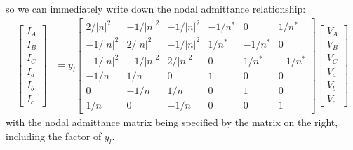 \documentclass[11pt]{article}
\begin{document}
so we can immediately write down the nodal admittance relationship:
\begin{align}
\begin{bmatrix}I_A \\ I_B \\ I_C \\ I_a \\ I_b \\ I_c\end{bmatrix} &=
y_l \begin{bmatrix}
	2/|n|^2 & -1/|n|^2 & -1/|n|^2 & -1/n^* & 0 & 1/n^* \\
	-1/|n|^2 & 2/|n|^2 &  -1/|n|^2 & 1/n^*  & -1/n^* & 0 \\
	-1/|n|^2 &  -1/|n|^2 & 2/|n|^2 & 0 & 1/n^*  & -1/n^* \\
	-1/n & 1/n & 0 & 1 & 0 & 0 \\
	0 & -1/n & 1/n & 0 & 1 & 0 \\
	1/n & 0 & -1/n & 0 & 0 & 1
\end{bmatrix}
\begin{bmatrix}V_A \\ V_B \\ V_C \\ V_a \\ V_b \\ V_c\end{bmatrix}
\end{align}
with the nodal admittance matrix being specified by the matrix on the right, including the factor of $y_l$.
\end{document}
